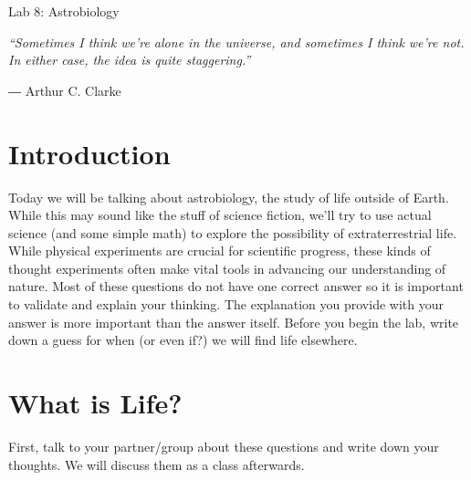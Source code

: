 \documentclass[12pt]{article}%
\begin{document}
\begin{center}
    \LARGE Lab 8: Astrobiology
\end{center}

\textit{“Sometimes I think we're alone in the universe, and sometimes I think we're not. In either case, the idea is quite staggering.”}

\begin{center}
― Arthur C. Clarke
\end{center} 


\section{Introduction}

Today we will be talking about astrobiology, the study of life outside of Earth. While this may sound like the stuff of science fiction, we'll try to use actual science (and some simple math) to explore the possibility of extraterrestrial life. While physical experiments are crucial for scientific progress, these kinds of thought experiments often make vital tools in advancing our understanding of nature. Most of these questions do not have one correct answer so it is important to validate and explain your thinking. The explanation you provide with your answer is more important than the answer itself. Before you begin the lab, write down a guess for when (or even if?) we will find life elsewhere. 


\section{What is Life?}

First, talk to your partner/group about these questions and write down your thoughts. We will discuss them as a class afterwards. 
\end{document}
